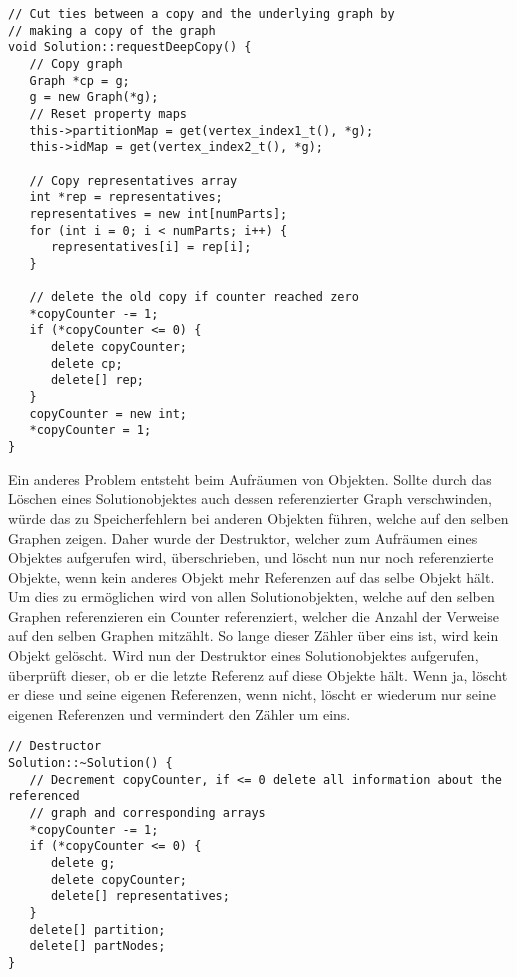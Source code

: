 \singlespacing
\begin{lstlisting}[caption={Die Methode \texttt{requestDeepCopy} of the Solution class},label={lst:deepcopy}]
// Cut ties between a copy and the underlying graph by 
// making a copy of the graph
void Solution::requestDeepCopy() {
   // Copy graph
   Graph *cp = g;
   g = new Graph(*g);
   // Reset property maps
   this->partitionMap = get(vertex_index1_t(), *g);
   this->idMap = get(vertex_index2_t(), *g);

   // Copy representatives array
   int *rep = representatives;
   representatives = new int[numParts];
   for (int i = 0; i < numParts; i++) {
      representatives[i] = rep[i];
   }

   // delete the old copy if counter reached zero
   *copyCounter -= 1;
   if (*copyCounter <= 0) {
      delete copyCounter;
      delete cp;
      delete[] rep;
   }
   copyCounter = new int;
   *copyCounter = 1;
}
\end{lstlisting}

Ein anderes Problem entsteht beim Aufräumen von Objekten. Sollte durch das Löschen eines Solutionobjektes auch dessen referenzierter Graph verschwinden, würde das zu Speicherfehlern bei anderen Objekten führen, 
welche auf den selben Graphen zeigen. Daher wurde der Destruktor, welcher zum Aufräumen eines Objektes aufgerufen wird, überschrieben, und löscht nun nur noch referenzierte Objekte, wenn kein anderes Objekt
mehr Referenzen auf das selbe Objekt hält. Um dies zu ermöglichen wird von allen Solutionobjekten, welche auf den selben Graphen referenzieren ein Counter referenziert, welcher die Anzahl der
Verweise auf den selben Graphen mitzählt. So lange dieser Zähler über eins ist, wird kein Objekt gelöscht. Wird nun der Destruktor eines Solutionobjektes aufgerufen, überprüft dieser, ob er die letzte
Referenz auf diese Objekte hält. Wenn ja, löscht er diese und seine eigenen Referenzen, wenn nicht, löscht er wiederum nur seine eigenen Referenzen und vermindert den Zähler um eins.

\begin{lstlisting}[caption={Der Destruktor der Solutionklasse mit Rücksichtnahme auf eventuelle verbleibende Referenzen},label={lst:destruct}]
// Destructor
Solution::~Solution() {
   // Decrement copyCounter, if <= 0 delete all information about the referenced
   // graph and corresponding arrays
   *copyCounter -= 1;
   if (*copyCounter <= 0) {
      delete g;
      delete copyCounter;
      delete[] representatives;
   }
   delete[] partition;
   delete[] partNodes;
}
\end{lstlisting}

